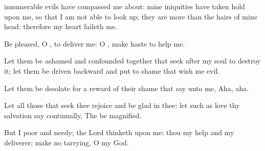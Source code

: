 {innumerable
evils have
compassed me about: mine
iniquities have taken
hold upon me, so that I am not
able to look
up; they are
more than the
hairs of mine
head: therefore my
heart
faileth me.
\par }{\Q {}Be
pleased, O
{}, to
deliver me: O
{}, make
haste to
help me.
\par }{\Q {}Let them be
ashamed and
confounded
together that
seek after my
soul to
destroy it; let them be
driven
backward and put to
shame that
wish me
evil.
\par }{\Q {}Let them be
desolate for a
reward of their
shame that
say unto me,
Aha,
aha.
\par }{\Q {}Let all those that
seek thee
rejoice and be
glad in thee: let such as
love thy
salvation
say
continually, The
{} be
magnified.
\par }{\Q {}But I
{}
poor and
needy;
{} the
Lord
thinketh upon me: thou
{} my
help and my
deliverer; make no
tarrying, O my
God.

}
